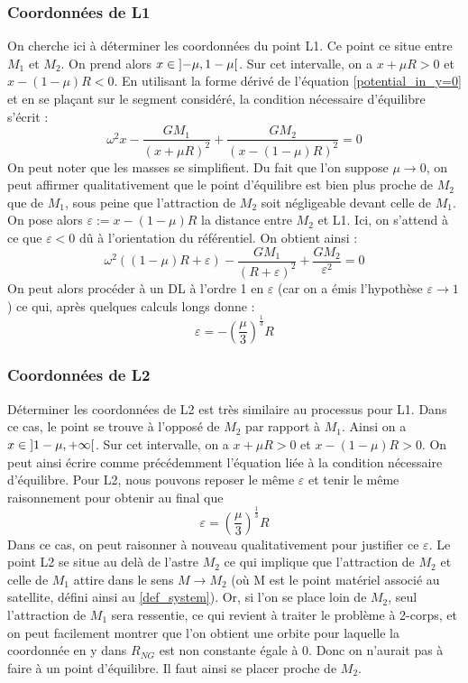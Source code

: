 \documentclass[12pt]{article}
\begin{document}
	
	\subsubsection{Coordonnées de L1}
	On cherche ici à déterminer les coordonnées du point L1. Ce point ce situe entre $M_1$ et $M_2$. On prend alors $x \in \interval[open]{-\mu}{1-\mu}$. Sur cet intervalle, on a $x+\mu R>0$ et $x-(1-\mu)R<0$. En utilisant la forme dérivé de l'équation \ref{potential_in_y=0} et en se plaçant sur le segment considéré, la condition nécessaire d'équilibre s'écrit :
	\begin{equation}
		\label{L1_equilibrium_eq}
		\omega^2x - \frac{GM_1}{(x+\mu R)^2} + \frac{GM_2}{(x-(1-\mu)R)^2} = 0
	\end{equation}
	On peut noter que les masses se simplifient.
	Du fait que l'on suppose $\mu \to 0$, on peut affirmer qualitativement que le point d'équilibre est bien plus proche de $M_2$ que de $M_1$, sous peine que l'attraction de $M_2$ soit négligeable devant celle de $M_1$. On pose alors $\varepsilon := x - (1-\mu)R$ la distance entre $M_2$ et L1. Ici, on s'attend à ce que $\varepsilon < 0$ dû à l'orientation du référentiel. On obtient ainsi :
	\begin{equation}
		\omega^2((1-\mu)R+\varepsilon) - \frac{GM_1}{(R+\varepsilon)^2} + \frac{GM_2}{\varepsilon^2} = 0
	\end{equation}
	On peut alors procéder à un DL à l'ordre 1 en $\varepsilon$ (car on a émis l'hypothèse $\varepsilon \to 1$) ce qui, après quelques calculs longs donne :
	\begin{equation}
		\varepsilon = -(\frac{\mu}{3})^\frac{1}{3}R
	\end{equation}
	
	
	\subsubsection{Coordonnées de L2}
	Déterminer les coordonnées de L2 est très similaire au processus pour L1. Dans ce cas, le point se trouve à l'opposé de $M_2$ par rapport à $M_1$. Ainsi on a $x \in \interval[open]{1-\mu}{+\infty}$. Sur cet intervalle, on a $x+\mu R>0$ et $x-(1-\mu)R>0$. On peut ainsi écrire comme précédemment l'équation liée à la condition nécessaire d'équilibre. Pour L2, nous pouvons reposer le même $\varepsilon$ et tenir le même raisonnement pour obtenir au final que
	\begin{equation}
		\varepsilon = (\frac{\mu}{3})^\frac{1}{3}R
	\end{equation}
	Dans ce cas, on peut raisonner à nouveau qualitativement pour justifier ce $\varepsilon$. Le point L2 se situe au delà de l'astre $M_2$ ce qui implique que l'attraction de $M_2$ et celle de $M_1$ attire dans le sens $M \to M_2$ (où M est le point matériel associé au satellite, défini ainsi au \ref{def_system}). Or, si l'on se place loin de $M_2$, seul l'attraction de $M_1$ sera ressentie, ce qui revient à traiter le problème à 2-corps, et on peut facilement montrer que l'on obtient une orbite pour laquelle la coordonnée en y dans $R_{NG}$ est non constante égale à 0. Donc on n'aurait pas à faire à un point d'équilibre. Il faut ainsi se placer proche de $M_2$.
	
\end{document}
